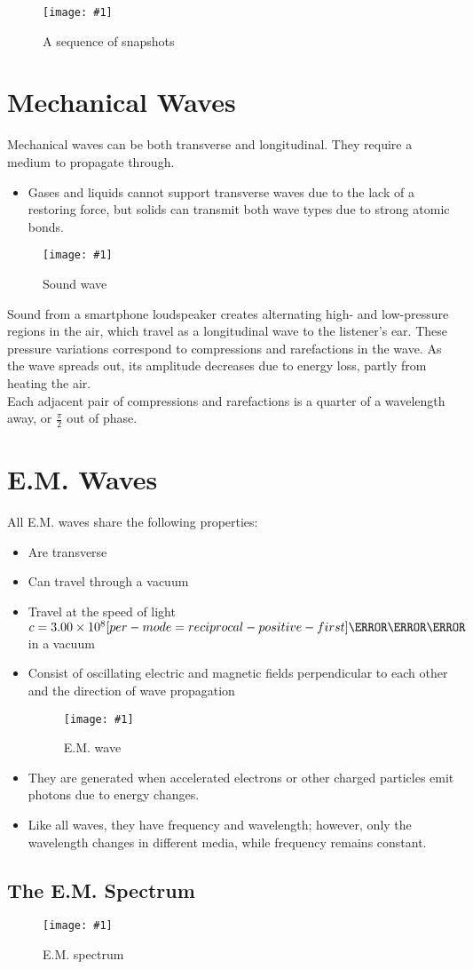 \documentclass[a4paper,12pt]{article}
\let\oldsection\section
\renewcommand\section{\clearpage\oldsection}
\let\oldsi\si
\renewcommand{\si}[1]{\oldsi[per-mode=reciprocal-positive-first]{#1}}
\newcommand{\lb}{\\[8pt]}
\newcommand{\img}[4]{\begin{center}
  \begin{figure}[H]
    \centering
    \texttt{[image: \#1]}
    \caption{#3}
    \label{fig:#4}
  \end{figure}
\end{center}}
\begin{document}
\img{4.png}{0.7}{A sequence of snapshots}{4}

\section{Mechanical Waves}

Mechanical waves can be both transverse and longitudinal. They require a medium to propagate through.
\begin{itemize}
  \item Gases and liquids cannot support transverse waves due to the lack of a restoring force, but solids can transmit both wave types due to strong atomic bonds.
\end{itemize}
\img{sound.png}{0.6}{Sound wave}{sound}
Sound from a smartphone loudspeaker creates alternating high- and low-pressure regions in the air, which travel as a longitudinal wave to the listener's ear. These pressure variations correspond to compressions and rarefactions in the wave. As the wave spreads out, its amplitude decreases due to energy loss, partly from heating the air.\lb
Each adjacent pair of compressions and rarefactions is a quarter of a wavelength away, or $\frac{\pi}{2}$ out of phase.

\section{E.M. Waves}

All E.M. waves share the following properties:
\begin{itemize}
  \item Are transverse
  \item Can travel through a vacuum
  \item Travel at the speed of light $c = 3.00 \times 10^8 \si{\meter\per\second}$ in a vacuum
  \item Consist of oscillating electric and magnetic fields perpendicular to each other and the direction of wave propagation
        \img{em.png}{0.6}{E.M. wave}{em}
  \item They are generated when accelerated electrons or other charged particles emit photons due to energy changes.
  \item Like all waves, they have frequency and wavelength; however, only the wavelength changes in different media, while frequency remains constant.
\end{itemize}

\pagebreak

\subsection{The E.M. Spectrum}

\img{emspectrum.jpg}{0.9}{E.M. spectrum}{emspectrum}
\end{document}
